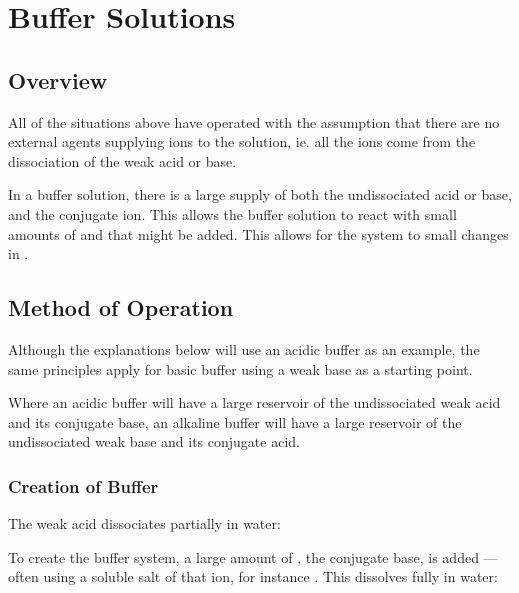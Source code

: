 


	\section{Buffer Solutions}

		\subsection{Overview}

			All of the situations above have operated with the assumption that there are no external agents supplying ions to the solution,
			ie. all the ions come from the dissociation of the weak acid or base.

			In a buffer solution, there is a large supply of both the undissociated acid or base, and the conjugate ion. This allows the
			buffer solution to react with small amounts of   and  that might be added. This allows for the system
			to  small changes in \pH{}.



		\subsection{Method of Operation}

			Although the explanations below will use an acidic buffer as an example, the same principles apply for basic buffer using a weak
			base as a starting point.

			Where an acidic buffer will have a large reservoir of the undissociated weak acid and its conjugate base, an alkaline buffer will
			have a large reservoir of the undissociated weak base and its conjugate acid.

			\pagebreak
			\subsubsection{Creation of Buffer}

				The weak acid  dissociates partially in water:


				To create the buffer system, a large amount of , the conjugate base, is added --- often using a soluble salt of
				that ion, for instance . This dissolves fully in water:


